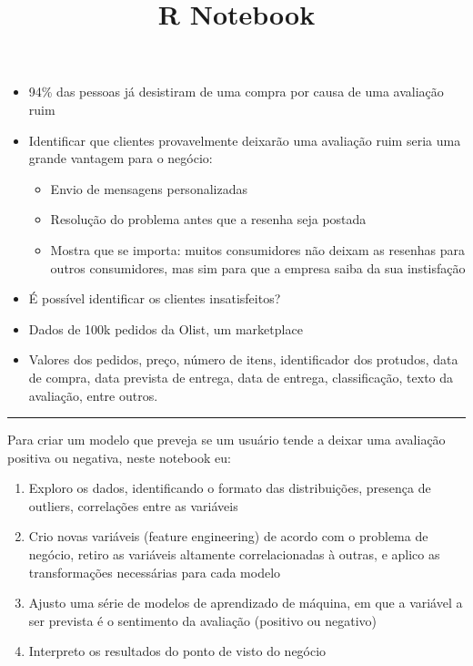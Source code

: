 \documentclass[
]{article}
\title{R Notebook}
\author{}
\date{\vspace{-2.5em}}
\providecommand{\tightlist}{%
  \setlength{\itemsep}{0pt}\setlength{\parskip}{0pt}}
\begin{document}
\maketitle

\begin{itemize}
\tightlist
\item
  94\% das pessoas já desistiram de uma compra por causa de uma
  avaliação ruim
\item
  Identificar que clientes provavelmente deixarão uma avaliação ruim
  seria uma grande vantagem para o negócio:

  \begin{itemize}
  \tightlist
  \item
    Envio de mensagens personalizadas
  \item
    Resolução do problema antes que a resenha seja postada
  \item
    Mostra que se importa: muitos consumidores não deixam as resenhas
    para outros consumidores, mas sim para que a empresa saiba da sua
    instisfação
  \end{itemize}
\item
  É possível identificar os clientes insatisfeitos?
\item
  Dados de 100k pedidos da Olist, um marketplace
\item
  Valores dos pedidos, preço, número de itens, identificador dos
  protudos, data de compra, data prevista de entrega, data de entrega,
  classificação, texto da avaliação, entre outros.
\end{itemize}

\begin{center}\rule{0.5\linewidth}{0.5pt}\end{center}

Para criar um modelo que preveja se um usuário tende a deixar uma
avaliação positiva ou negativa, neste notebook eu:

\begin{enumerate}
\def\labelenumi{\arabic{enumi}.}
\tightlist
\item
  Exploro os dados, identificando o formato das distribuições, presença
  de outliers, correlações entre as variáveis
\item
  Crio novas variáveis (feature engineering) de acordo com o problema de
  negócio, retiro as variáveis altamente correlacionadas à outras, e
  aplico as transformações necessárias para cada modelo
\item
  Ajusto uma série de modelos de aprendizado de máquina, em que a
  variável a ser prevista é o sentimento da avaliação (positivo ou
  negativo)
\item
  Interpreto os resultados do ponto de visto do negócio
\end{enumerate}
\end{document}
